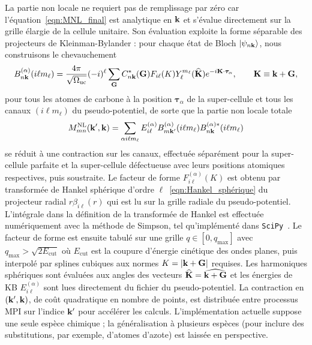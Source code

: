 La partie non locale ne requiert pas de remplissage par zéro car l'équation~\eqref{eqn:MNL_final} est analytique en $\mathbf{k}$ et s'évalue directement sur la grille élargie de la cellule unitaire. Son évaluation exploite la forme séparable des projecteurs de Kleinman-Bylander : pour chaque état de Bloch $\ket{\psi_{n\mathbf{k}}}$, nous construisons le chevauchement
\begin{equation}
    B_{n\mathbf{k}}^{(\alpha)}(i\ell m_\ell) = \frac{4\pi}{\sqrt{\Omega_\text{uc}}}(-i)^\ell\sum_{\mathbf{G}}C^*_{n\mathbf{k}} (\mathbf{G}) F_{i\ell}(K)Y_\ell^{m_\ell}(\widehat{\mathbf{K}})e^{-i\mathbf{K}\cdot\bm\tau_\alpha},\qquad \mathbf{K}\equiv \mathbf{k}+\mathbf{G},
\end{equation}
pour tous les atomes de carbone à la position $\bm\tau_\alpha$ de la super-cellule et tous les canaux $(i\ell m_\ell)$ du pseudo-potentiel, de sorte que la partie non locale totale
\begin{equation}
M^\text{NL}_{mn}(\mathbf{k}',\mathbf{k})=\sum_{\alpha i\ell m_\ell}E_{i\ell}^{(\alpha)}B_{m\mathbf{k}'}^{(\alpha)}(i\ell m_\ell) B^{(\alpha)*}_{n\mathbf{k}}(i\ell m_\ell)
\end{equation}
se réduit à une contraction sur les canaux, effectuée séparément pour la super-cellule parfaite et la super-cellule défectueuse avec leurs positions atomiques respectives, puis soustraite. Le facteur de forme $F_{i\ell}^{(\alpha)}(K)$ est obtenu par transformée de Hankel sphérique d'ordre $\ell$~\eqref{eqn:Hankel_sphérique} du projecteur radial $r\beta_{i\ell}(r)$ qui est lu sur la grille radiale du pseudo-potentiel. L'intégrale dans la définition de la transformée de Hankel est effectuée numériquement avec la méthode de Simpson, tel qu'implémenté dans \texttt{SciPy}~\cite{virtanenSciPy10Fundamental2020}. Le facteur de forme est ensuite tabulé sur une grille $q\in[0,q_\text{max}]$ avec $q_\text{max}>\sqrt{2E_\text{cut}}$ où $E_\text{cut}$ est la coupure d'énergie cinétique des ondes planes, puis interpolé par splines cubiques aux normes $K=|\mathbf{k}+\mathbf{G}|$ requises. Les harmoniques sphériques sont évaluées aux angles des vecteurs $\widehat{\mathbf{K}} =\widehat{\mathbf{k}+\mathbf{G}}$ et les énergies de KB $E_{i\ell}^{(\alpha)}$ sont lues directement du fichier du pseudo-potentiel. La contraction en $(\mathbf{k}',\mathbf{k})$, de coût quadratique en nombre de points, est distribuée entre processus MPI sur l'indice $\mathbf{k}'$ pour accélérer les calculs. L'implémentation actuelle suppose une seule espèce chimique ; la généralisation à plusieurs espèces (pour inclure des substitutions, par exemple, d'atomes d'azote) est laissée en perspective.


